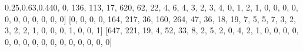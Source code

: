 \documentclass[
]{article}
\newenvironment{Shaded}{}{}
\newcommand{\DecValTok}[1]{\textcolor[rgb]{0.25,0.63,0.44}{#1}}
\newcommand{\NormalTok}[1]{#1}
\begin{document}
\begin{Shaded}
\begin{Highlighting}[]
\NormalTok{[}\DecValTok{0}\NormalTok{, }\DecValTok{0}\NormalTok{, }\DecValTok{136}\NormalTok{, }\DecValTok{113}\NormalTok{, }\DecValTok{17}\NormalTok{, }\DecValTok{620}\NormalTok{, }\DecValTok{62}\NormalTok{, }\DecValTok{22}\NormalTok{, }\DecValTok{4}\NormalTok{, }\DecValTok{6}\NormalTok{, }\DecValTok{4}\NormalTok{, }\DecValTok{3}\NormalTok{, }\DecValTok{2}\NormalTok{, }\DecValTok{3}\NormalTok{, }\DecValTok{4}\NormalTok{, }
\DecValTok{0}\NormalTok{, }\DecValTok{1}\NormalTok{, }\DecValTok{2}\NormalTok{, }\DecValTok{1}\NormalTok{, }\DecValTok{0}\NormalTok{, }\DecValTok{0}\NormalTok{, }\DecValTok{0}\NormalTok{, }\DecValTok{0}\NormalTok{, }\DecValTok{0}\NormalTok{, }\DecValTok{0}\NormalTok{, }\DecValTok{0}\NormalTok{, }\DecValTok{0}\NormalTok{, }\DecValTok{0}\NormalTok{, }\DecValTok{0}\NormalTok{, }\DecValTok{0}\NormalTok{]}
\NormalTok{[}\DecValTok{0}\NormalTok{, }\DecValTok{0}\NormalTok{, }\DecValTok{0}\NormalTok{, }\DecValTok{0}\NormalTok{, }\DecValTok{164}\NormalTok{, }\DecValTok{217}\NormalTok{, }\DecValTok{36}\NormalTok{, }\DecValTok{160}\NormalTok{, }\DecValTok{264}\NormalTok{, }\DecValTok{47}\NormalTok{, }\DecValTok{36}\NormalTok{, }\DecValTok{18}\NormalTok{, }\DecValTok{19}\NormalTok{, }\DecValTok{7}\NormalTok{, }\DecValTok{5}\NormalTok{, }
\DecValTok{5}\NormalTok{, }\DecValTok{7}\NormalTok{, }\DecValTok{3}\NormalTok{, }\DecValTok{2}\NormalTok{, }\DecValTok{3}\NormalTok{, }\DecValTok{2}\NormalTok{, }\DecValTok{2}\NormalTok{, }\DecValTok{1}\NormalTok{, }\DecValTok{0}\NormalTok{, }\DecValTok{0}\NormalTok{, }\DecValTok{0}\NormalTok{, }\DecValTok{1}\NormalTok{, }\DecValTok{0}\NormalTok{, }\DecValTok{0}\NormalTok{, }\DecValTok{1}\NormalTok{]}
\NormalTok{[}\DecValTok{647}\NormalTok{, }\DecValTok{221}\NormalTok{, }\DecValTok{19}\NormalTok{, }\DecValTok{4}\NormalTok{, }\DecValTok{52}\NormalTok{, }\DecValTok{33}\NormalTok{, }\DecValTok{8}\NormalTok{, }\DecValTok{2}\NormalTok{, }\DecValTok{5}\NormalTok{, }\DecValTok{2}\NormalTok{, }\DecValTok{0}\NormalTok{, }\DecValTok{4}\NormalTok{, }\DecValTok{2}\NormalTok{, }\DecValTok{1}\NormalTok{, }\DecValTok{0}\NormalTok{, }\DecValTok{0}\NormalTok{, }
\DecValTok{0}\NormalTok{, }\DecValTok{0}\NormalTok{, }\DecValTok{0}\NormalTok{, }\DecValTok{0}\NormalTok{, }\DecValTok{0}\NormalTok{, }\DecValTok{0}\NormalTok{, }\DecValTok{0}\NormalTok{, }\DecValTok{0}\NormalTok{, }\DecValTok{0}\NormalTok{, }\DecValTok{0}\NormalTok{, }\DecValTok{0}\NormalTok{, }\DecValTok{0}\NormalTok{, }\DecValTok{0}\NormalTok{, }\DecValTok{0}\NormalTok{]}
\end{Highlighting}
\end{Shaded}
\end{document}
